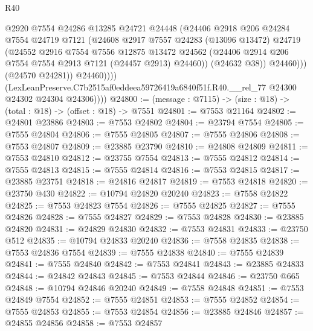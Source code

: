 \begin{lexlean}{R40}
\begin{coremodule}
                        @2920
                        @7554
                        @24286
                        @13285
                        @24721
                        @24448
                        (@24406
                          @2918
                          @206
                          @24284
                          @7554
                          @24719
                          @7121
                          (@24608
                            @2917
                            @7557
                            @24283
                            (@13096 @13472)
                            @24719
                            (@24552
                              @2916
                              @7554
                              @7556
                              @12875
                              @13472
                              @24562
                              (@24406 @2914 @206 @7554 @7554 @2913 @7121 (@24457 @2913) @24460))
                            (@24632 @38))
                          @24460)))
                    (@24570 @24281))
                  @24460))))
          (LexLeanPreserve.C7b2515af0eddeea59726419a6840f51f.R40.__rel_77
            @24300
            @24302
            @24304
            @24306))))
@24800 := (message : @7115) -> (size : @18) -> (total : @18) -> (offset : @18) -> @7551
@24801 := @7553 @21164
@24802 := @24801 @23886
@24803 := @7553 @24802
@24804 := @23794 @7554
@24805 := @7555 @24804
@24806 := @7555 @24805
@24807 := @7555 @24806
@24808 := @7553 @24807
@24809 := @23885 @23790
@24810 := @24808 @24809
@24811 := @7553 @24810
@24812 := @23755 @7554
@24813 := @7555 @24812
@24814 := @7555 @24813
@24815 := @7555 @24814
@24816 := @7553 @24815
@24817 := @23885 @23751
@24818 := @24816 @24817
@24819 := @7553 @24818
@24820 := @23750 @430
@24822 := @10794 @24820 @20240
@24823 := @7558 @24822
@24825 := @7553 @24823 @7554
@24826 := @7555 @24825
@24827 := @7555 @24826
@24828 := @7555 @24827
@24829 := @7553 @24828
@24830 := @23885 @24820
@24831 := @24829 @24830
@24832 := @7553 @24831
@24833 := @23750 @512
@24835 := @10794 @24833 @20240
@24836 := @7558 @24835
@24838 := @7553 @24836 @7554
@24839 := @7555 @24838
@24840 := @7555 @24839
@24841 := @7555 @24840
@24842 := @7553 @24841
@24843 := @23885 @24833
@24844 := @24842 @24843
@24845 := @7553 @24844
@24846 := @23750 @665
@24848 := @10794 @24846 @20240
@24849 := @7558 @24848
@24851 := @7553 @24849 @7554
@24852 := @7555 @24851
@24853 := @7555 @24852
@24854 := @7555 @24853
@24855 := @7553 @24854
@24856 := @23885 @24846
@24857 := @24855 @24856
@24858 := @7553 @24857

\end{coremodule}
\end{lexlean}
